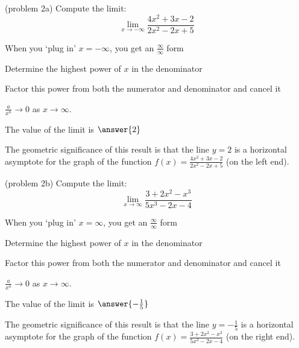 \documentclass[handout]{ximera}
\begin{document}
\begin{problem}(problem 2a)
  Compute the limit:
  \[
  \lim_{x \to -\infty} \frac{4x^2 + 3x - 2}{2x^2 - 2x + 5}
  \]
  
    \begin{hint}
      When you `plug in' $x = -\infty$, you get an $\frac{\infty}{\infty}$ form
    \end{hint}
    \begin{hint}
      Determine the highest power of $x$ in the denominator
    \end{hint}
    \begin{hint}
      Factor this power from both the numerator and denominator and cancel it
    \end{hint}
    \begin{hint}
      $\frac{a}{x^n} \to 0$ as $x \to \infty$.
    \end{hint}
		The value of the limit is
		 $\answer{2}$
		
		The geometric significance of this result is that the line $y=2$  
is a horizontal asymptote for the graph of the function $f(x) = \frac{4x^2 + 3x - 2}{2x^2 - 2x + 5}$ (on the left end).
\end{problem}



\begin{problem}(problem 2b)
  Compute the limit:
  \[
  \lim_{x \to \infty} \frac{3 + 2x^2 - x^3}{5x^3 - 2x -4}
  \]
  
    \begin{hint}
      When you `plug in' $x = \infty$, you get an $\frac{\infty}{\infty}$ form
    \end{hint}
    \begin{hint}
      Determine the highest power of $x$ in the denominator
    \end{hint}
    \begin{hint}
      Factor this power from both the numerator and denominator and cancel it
    \end{hint}
    \begin{hint}
      $\frac{a}{x^n} \to 0$ as $x \to \infty$.
    \end{hint}
		The value of the limit is
		 $\answer{-\frac15}$
		
		The geometric significance of this result is that the line $y=-\frac15$  
is a horizontal asymptote for the graph of the function $f(x) = \frac{3 + 2x^2 - x^3}{5x^3 - 2x -4}$ (on the right end).
\end{problem}
\end{document}
